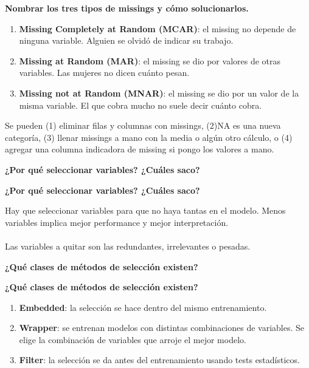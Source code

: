 \documentclass[10pt]{memoir}
\begin{document}
\clearpage
\begin{center}
	\textbf{\Large Nombrar los tres tipos de missings y cómo solucionarlos.} \\
\end{center}
\begin{enumerate}
	\item \textbf{Missing Completely at Random (MCAR)}: el missing no depende de ninguna variable. Alguien se olvidó de indicar su trabajo.
	\item \textbf{Missing at Random (MAR)}: el missing se dio por valores de otras variables. Las mujeres no dicen cuánto pesan.
	\item \textbf{Missing not at Random (MNAR)}: el missing se dio por un valor de la misma variable. El que cobra mucho no suele decir cuánto cobra.
\end{enumerate}
\noindent Se pueden (1) eliminar filas y columnas con missings, (2)NA es una nueva categoría, (3) llenar missings a mano con la media o algún otro cálculo, o (4) agregar una columna indicadora de missing si pongo los valores a mano.

\clearpage
\begin{center}
	\textbf{\Large ¿Por qué seleccionar variables? ¿Cuáles saco?} \\
\end{center}

\clearpage
\begin{center}
	\textbf{\Large ¿Por qué seleccionar variables? ¿Cuáles saco?} \\
\end{center}
\noindent Hay que seleccionar variables para que no haya tantas en el modelo. Menos variables implica mejor performance y mejor interpretación. \\
\\
\noindent Las variables a quitar son las redundantes, irrelevantes o pesadas.

\clearpage
\begin{center}
	\textbf{\Large ¿Qué clases de métodos de selección existen?} \\
\end{center}

\clearpage
\begin{center}
	\textbf{\Large ¿Qué clases de métodos de selección existen?} \\
\end{center}
\begin{enumerate}
	\item \textbf{Embedded}: la selección se hace dentro del mismo entrenamiento.
	\item \textbf{Wrapper}: se entrenan modelos con distintas combinaciones de variables. Se elige la combinación de variables que arroje el mejor modelo.
	\item \textbf{Filter}: la selección se da antes del entrenamiento usando tests estadísticos.
\end{enumerate}
\end{document}
